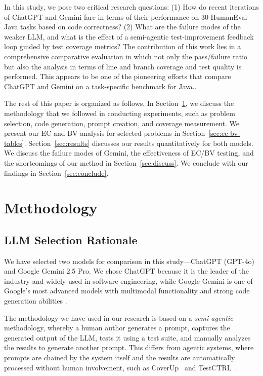 \documentclass[journal]{IEEEtran}
\begin{document}
In this study, we pose two critical research questions: (1) How do recent iterations of ChatGPT and Gemini fare in terms of their performance on 30 HumanEval-Java tasks based on code correctness? (2) What are the failure modes of the weaker LLM, and what is the effect of a semi-agentic test-improvement feedback loop guided by test coverage metrics? The contribution of this work lies in a comprehensive comparative evaluation in which not only the pass/failure ratio but also the analysis in terms of line and branch coverage and test quality is performed. This appears to be one of the pioneering efforts that compare ChatGPT and Gemini on a task-specific benchmark for Java..

The rest of this paper is organized as follows. In Section~\ref{sec:method}, we discuss the methodology that we followed in conducting experiments, such as problem selection, code generation, prompt creation, and coverage measurement. We present our EC and BV analysis for selected problems in Section~\ref{sec:ec-bv-tables}. Section~\ref{sec:results} discusses our results quantitatively for both models. We discuss the failure modes of Gemini, the effectiveness of EC/BV testing, and the shortcomings of our method in Section~\ref{sec:discuss}. We conclude with our findings in Section~\ref{sec:conclude}.




\section{Methodology}
\label{sec:method}

\subsection{LLM Selection Rationale}
We have selected two models for comparison in this study—ChatGPT (GPT-4o) and Google Gemini 2.5 Pro. We chose ChatGPT because it is the leader of the industry and widely used in software engineering, while Google Gemini is one of Google’s most advanced models with multimodal functionality and strong code generation abilities \cite{caracciolo2026guidelines}.

The methodology we have used in our research is based on a \textit{semi-agentic} methodology, whereby a human author generates a prompt, captures the generated output of the LLM, tests it using a test suite, and manually analyzes the results to generate another prompt. This differs from agentic systems, where prompts are chained by the system itself and the results are automatically processed without human involvement, such as CoverUp~\cite{pizzorno2024coverup} and TestCTRL~\cite{yuan2025testctrl}.
\end{document}
